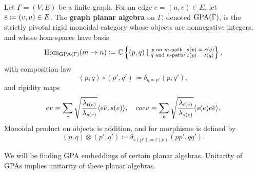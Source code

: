 \begin{definition}\label{def:GPA}
    Let $\Gamma=(V,E)$ be a finite graph. 
    For an edge $e=(u,v)\in E$, let $\overline{e} \coloneq (v,u)\in E$. 
    The {\bf graph planar algebra} on $\Gamma$, denoted $\operatorname{GPA}(\Gamma)$, is the strictly pivotal rigid monoidal category 
    whose objects are nonnegative integers, and whose hom-spaces have basis
    \[
        \operatorname{Hom}_{\operatorname{GPA}(\Gamma)}(m\to n) \coloneqq \mathbb{C}\left\{ (p,q) \mid \substack{\text{$p$ an $m$-path} \\ \text{$q$ and $n$-path}}, \substack{\text{$s(p)=s(q)$}\\ \text{$t(p)=t(q)$}} \right\},
    \]
    with composition law
    \[
        (p,q)\circ(p',q')\coloneqq \delta_{q=p'} (p,q'),
    \]
    and rigidity maps
    \[
        ev = \sum_e \sqrt{ \frac{\lambda_{t(e)}}{\lambda_{s(e)}} } \langle e\overline{e},s(e) \rangle, \quad coev = \sum_e \sqrt{ \frac{\lambda_{t(e)}}{\lambda_{s(e)}} } \langle s(e) e\overline{e} \rangle. 
    \]
    Monoidal product on objects is addition, and for morphisms is defined by 
    \[
        (p,q)\otimes(p',q')\coloneqq \delta_{s(p')=t(p)} (pp',qq').
    \]
\end{definition}


We will be finding GPA embeddings of certain planar algebras. 
Unitarity of GPAs implies unitarity of these planar algebras.









\begin{comment}
Monoidal functors interact with algebra objects in the ways we would hope.
\begin{proposition}
    Let $\FF:\CC\to\DD$ be a lax-monoidal fucntor, and let $A$ be an algebra object of $\CC$. 
    Then $\FF A$ has algebra structure induced by $\FF$. 
    If $M$ is a right $A$-module object of $\CC$ then $\FF M$ has a right $\FF A$-moudle structure induced by $\FF$.
\end{proposition}


The following proposition gives us license to make similar statements about adjoints of monoidal functors.
\begin{proposition}
    Monoidal functors between semisimple categories have lax-monoidal right adjoints.
\end{proposition}
\end{comment}

